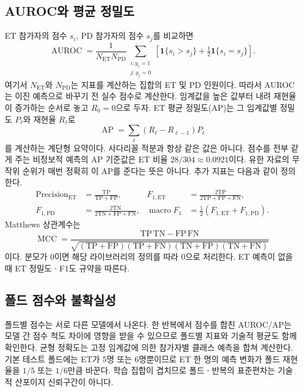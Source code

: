 \documentclass[11pt,a4paper]{article}
\newcommand{\ind}{\mathbf{1}}
\newcommand{\PD}{\mathrm{PD}}
\newcommand{\ET}{\mathrm{ET}}
\newcommand{\code}[1]{\texttt{\detokenize{#1}}}
\numberwithin{equation}{section}
\begin{document}
\subsection{AUROC와 평균 정밀도}
ET 참가자의 점수 \(s_i\), PD 참가자의 점수 \(s_j\)를 비교하면
\begin{equation}
 \operatorname{AUROC}=\frac1{N_{\ET}N_{\PD}}
 \sum_{\substack{i:y_i=1\\j:y_j=0}}
 \left[\ind\{s_i>s_j\}+\tfrac12\ind\{s_i=s_j\}\right].
\end{equation}
여기서 \(N_{\ET}\)와 \(N_{\PD}\)는 지표를 계산하는 집합의 ET 및 PD 인원이다.
따라서 AUROC는 이진 예측으로 바꾸기 전 실수 점수로 계산한다.
임계값을 높은 값부터 내려 재현율이 증가하는 순서로 놓고 \(R_0=0\)으로 두자.
ET 평균 정밀도(AP)는 그 임계값별 정밀도 \(P_\ell\)와 재현율 \(R_\ell\)로
\begin{equation}
 \operatorname{AP}=\sum_\ell(R_\ell-R_{\ell-1})P_\ell
\end{equation}
를 계산하는 계단형 요약이다. 사다리꼴 적분과 항상 같은 값은 아니다.
점수를 전부 같게 주는 비정보적 예측의 AP 기준값은
ET 비율 \(28/304\approx0.0921\)이다.
유한 자료의 무작위 순위가 매번 정확히 이 AP를 준다는 뜻은 아니다.
추가 지표는 다음과 같이 정의한다.
\begin{align}
 \operatorname{Precision}_{\ET}
 &=\frac{\mathrm{TP}}{\mathrm{TP}+\mathrm{FP}},&
 F_{1,\ET}&=\frac{2\mathrm{TP}}{2\mathrm{TP}+\mathrm{FP}+\mathrm{FN}},\\
 F_{1,\PD}&=\frac{2\mathrm{TN}}{2\mathrm{TN}+\mathrm{FP}+\mathrm{FN}},&
 \operatorname{macro}F_1&=\tfrac12(F_{1,\ET}+F_{1,\PD}).
\end{align}
Matthews 상관계수는
\begin{equation}
 \operatorname{MCC}
 =\frac{\mathrm{TP}\,\mathrm{TN}-\mathrm{FP}\,\mathrm{FN}}
 {\sqrt{(\mathrm{TP}+\mathrm{FP})(\mathrm{TP}+\mathrm{FN})
        (\mathrm{TN}+\mathrm{FP})(\mathrm{TN}+\mathrm{FN})}}
\end{equation}
이다. 분모가 \(0\)이면 해당 라이브러리의 정의를 따라 \(0\)으로 처리한다.
ET 예측이 없을 때 ET 정밀도ㆍF1도 \code{zero_division=0} 규약을 따른다.

\subsection{폴드 점수와 불확실성}
폴드별 점수는 서로 다른 모델에서 나온다.
한 반복에서 점수를 합친 AUROC/AP는 모델 간 점수 척도 차이에 영향을 받을 수
있으므로 폴드별 지표와 기술적 평균도 함께 확인한다.
균형 정확도는 고정 임계값에 의한 참가자별 클래스 예측을 합쳐 계산한다.
기본 테스트 폴드에는 ET가 5명 또는 6명뿐이므로
ET 한 명의 예측 변화가 폴드 재현율을 \(1/5\) 또는 \(1/6\)만큼 바꾼다.
학습 집합이 겹치므로 폴드ㆍ반복의 표준편차는 기술적 산포이지 신뢰구간이 아니다.
\end{document}
